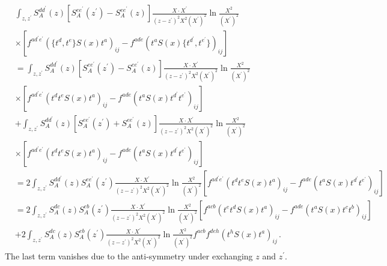 \documentclass[11pt,a4paper]{article}
\begin{document}
\begin{equation}\begin{split}\label{id1}
&\int_{z,z^{\prime}}S_{A}^{dd^{\prime}}(z)\left[S_{A}^{ee^{\prime}}(z^{\prime})-S_{A}^{ee^{\prime}}(z)\right]\frac{X\cdot X^{\prime}}{(z-z^{\prime})^{2}X^{2}(X^{\prime})^{2}}\ln\frac{X^{2}}{(X^{\prime})^{2}}\\
&\times \left[f^{ad^{\prime}e^{\prime}}(\{t^{d},t^{e}\}S(x)t^{a})_{ij}-f^{ade}(t^{a}S(x)\{t^{d^{\prime}},t^{e^{\prime}}\})_{ij}\right]\\
&=\int_{z,z^{\prime}}S_{A}^{dd^{\prime}}(z)\left[S_{A}^{ee^{\prime}}(z^{\prime})-S_{A}^{ee^{\prime}}(z)\right]\frac{X\cdot X^{\prime}}{(z-z^{\prime})^{2}X^{2}(X^{\prime})^{2}}\ln\frac{X^{2}}{(X^{\prime})^{2}}\\ 
&\times \left[f^{ad^{\prime}e^{\prime}}(t^{d}t^{e}S(x)t^{a})_{ij}-f^{ade}(t^{a}S(x)t^{d^{\prime}}t^{e^{\prime}})_{ij}\right]\\
&+\int_{z,z^{\prime}}S_{A}^{dd^{\prime}}(z)\left[S_{A}^{ee^{\prime}}(z^{\prime})+S_{A}^{ee^{\prime}}(z)\right]\frac{X\cdot X^{\prime}}{(z-z^{\prime})^{2}X^{2}(X^{\prime})^{2}}\ln\frac{X^{2}}{(X^{\prime})^{2}}\\ 
&\times \left[f^{ad^{\prime}e^{\prime}}(t^{d}t^{e}S(x)t^{a})_{ij}-f^{ade}(t^{a}S(x)t^{d^{\prime}}t^{e^{\prime}})_{ij}\right]\\
&=2\int_{z,z^{\prime}}S_{A}^{dd^{\prime}}(z)S_{A}^{ee^{\prime}}(z^{\prime})\frac{X\cdot X^{\prime}}{(z-z^{\prime})^{2}X^{2}(X^{\prime})^{2}}\ln\frac{X^{2}}{(X^{\prime})^{2}}\left[f^{ad^{\prime}e^{\prime}}(t^{d}t^{e}S(x)t^{a})_{ij}-f^{ade}(t^{a}S(x)t^{d^{\prime}}t^{e^{\prime}})_{ij}\right]\\
&=2\int_{z,z^{\prime}}S_{A}^{dc}(z)S_{A}^{eb}(z^{\prime})\frac{X\cdot X^{\prime}}{(z-z^{\prime})^{2}X^{2}(X^{\prime})^{2}}\ln\frac{X^{2}}{(X^{\prime})^{2}}\left[f^{acb}(t^{e}t^{d}S(x)t^{a})_{ij}-f^{ade}(t^{a}S(x)t^{c}t^{b})_{ij}\right]
\\
&+2\int_{z,z^{\prime}}S_{A}^{dc}(z)S_{A}^{eb}(z^{\prime})\frac{X\cdot X^{\prime}}{(z-z^{\prime})^{2}X^{2}(X^{\prime})^{2}}\ln\frac{X^{2}}{(X^{\prime})^{2}}f^{acb}f^{deh}(t^{h}S(x)t^{a})_{ij}\,. 
 \end{split}\end{equation}
The last term vanishes due to the anti-symmetry under exchanging $z$ and $z^{\prime}$.
\end{document}
